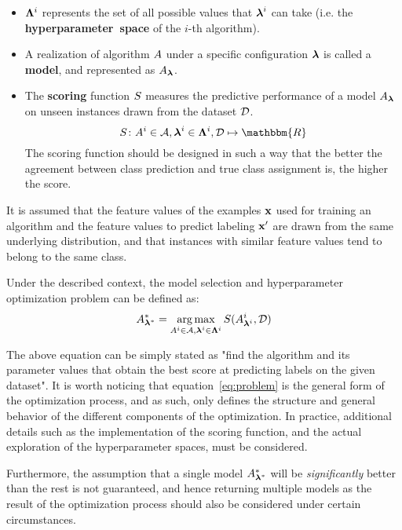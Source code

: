 \begin{itemize}
		\item
		$\mathbf{\Lambda}^i$ represents the set of all possible values that $\boldsymbol{\lambda}^i$ can take (i.e. the
		{\bf hyperparameter~space} of the $i$-th algorithm).

		\item
		A realization of algorithm $A$ under a specific configuration $\boldsymbol{\lambda}$ is called a {\bf model}, and
		represented as $A_{\boldsymbol{\lambda}}$.

		\item
		The {\bf scoring} function $S$ measures the predictive performance of a model $A_{\boldsymbol{\lambda}}$ 
		on unseen instances drawn from the dataset
		$\mathcal{D}$.
		\begin{equation}
			\Score \colon \algo^i \in \algoset, \param^i \in \paramspace^i, \alldata \mapsto
			\mathbbm{R}
		\end{equation}
		The scoring function should be designed in such a way that the better the agreement between
		class prediction and true class assignment is, the higher the score.
	\end{itemize}

	It is assumed that the feature values of the examples $\mathbf{x}$ used for training an algorithm
	and the feature values to predict labeling $\mathbf{x}'$ are drawn from the same underlying
	distribution, and that instances with similar feature values tend to belong to the same class.

	Under the described context, the model selection and hyperparameter optimization problem can be
	defined as:
	\begin{equation}
		\label{eq:problem}
		A^*_{\boldsymbol{\lambda}^*} = \operatorname*{arg\,max}_{A^i \in \mathcal{A}, \boldsymbol{\lambda}^i \in \mathbf{\Lambda}^i}
		S(A^i_{\boldsymbol{\lambda}^i}, \mathcal{D})
	\end{equation}

	The above equation can be simply stated as "find the algorithm and its parameter values that
	obtain the best score at predicting labels on the given dataset". It is worth noticing that
	equation~\ref{eq:problem} is the general form of the optimization process, and as such, only
	defines the structure and general behavior of the different components of the optimization. In
	practice, additional details such as the implementation of the scoring function, and the actual
	exploration of the hyperparameter spaces, must be considered.

	Furthermore, the assumption that a single model $A^*_{\boldsymbol{\lambda}^*}$ will be \emph{significantly} better than the
	rest is not guaranteed, and hence returning multiple models as the result of the
	optimization process should also be considered under certain circumstances.

